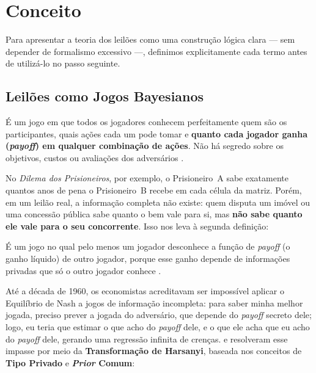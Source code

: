 \section{Conceito}
\label{sec:conceito}

Para apresentar a teoria dos leilões como uma construção lógica clara --- sem depender de formalismo excessivo ---, definimos explicitamente cada termo antes de utilizá-lo no passo seguinte.

\subsection{Leilões como Jogos Bayesianos}
\label{subsec:jogos_bayesianos}

\begin{definicao}
\label{def:info_completa}
É um jogo em que todos os jogadores conhecem perfeitamente quem são os participantes, quais ações cada um pode tomar e \textbf{quanto cada jogador ganha (\textit{payoff}) em qualquer combinação de ações}. Não há segredo sobre os objetivos, custos ou avaliações dos adversários \cite{gibbons1992}.
\end{definicao}

No \textit{Dilema dos Prisioneiros}, por exemplo, o Prisioneiro~A sabe exatamente quantos anos de pena o Prisioneiro~B recebe em cada célula da matriz. Porém, em um leilão real, a informação completa não existe: quem disputa um imóvel ou uma concessão pública sabe quanto o bem vale para si, mas \textbf{não sabe quanto ele vale para o seu concorrente}. Isso nos leva à segunda definição:

\begin{definicao}
\label{def:jogo_bayesiano}
É um jogo no qual pelo menos um jogador desconhece a função de \textit{payoff} (o ganho líquido) de outro jogador, porque esse ganho depende de informações privadas que só o outro jogador conhece \cite{harsanyi1967,gibbons1992}.
\end{definicao}

Até a década de 1960, os economistas acreditavam ser impossível aplicar o Equilíbrio de Nash a jogos de informação incompleta: para saber minha melhor jogada, preciso prever a jogada do adversário, que depende do \textit{payoff} secreto dele; logo, eu teria que estimar o que acho do \textit{payoff} dele, e o que ele acha que eu acho do \textit{payoff} dele, gerando uma regressão infinita de crenças. \cite{vickrey1961} e \cite{harsanyi1967} resolveram esse impasse por meio da \textbf{Transformação de Harsanyi}, baseada nos conceitos de \textbf{Tipo Privado} e \textbf{\textit{Prior} Comum}:


